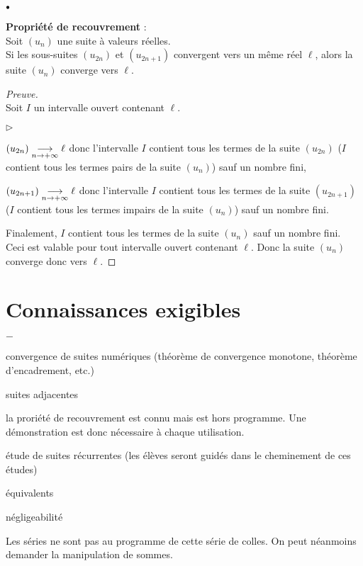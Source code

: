 \documentclass[11pt]{article}%
\begin{document}
\begin{noliste}{$\scriptstyle \bullet$}
   \item {\bf Propriété de recouvrement} :\\
   Soit $\left( u_n \right)$ une suite à valeurs réelles.\\ 
   Si les 
   sous-suites $\left(u_{2n} \right)$ et $\left( u_{2n+1} \right)$ 
   convergent vers un même réel $\ell$, alors la suite $\left( u_n 
   \right)$ converge vers $\ell$.
   \begin{proof}[Preuve]~\\
    Soit $I$ un intervalle ouvert contenant $\ell$.
    \begin{noliste}{$\triangleright$}
    \item $(u_{2n}) \underset{n\to +\infty}{\longrightarrow} \ell$ donc l'intervalle $I$ contient 
    tous les termes de la suite $(u_{2n})$ (\ie $I$ 
    contient tous les termes pairs de la suite $(u_{n})$) sauf un 
    nombre fini,
    \item $(u_{2n+1}) \underset{n\to +\infty}{\longrightarrow} \ell$ donc l'intervalle $I$ contient 
    tous les termes de la suite $(u_{2n+1})$ (\ie $I$ 
    contient tous les termes impairs de la suite $(u_{n})$) sauf un 
    nombre fini.
    \end{noliste}
    Finalement, $I$ contient tous les termes de la suite $\left( u_n 
    \right)$ sauf un nombre fini.\\
    Ceci est valable pour tout intervalle ouvert contenant $\ell$. 
    Donc la suite $\left( u_n \right)$ 
    converge donc vers $\ell$.
    \end{proof}
\end{noliste}


\section*{Connaissances exigibles}

\begin{noliste}{$-$}
\item convergence de suites numériques (théorème de convergence 
monotone, théorème d'encadrement, etc.)
\item suites adjacentes
\item la proriété de recouvrement est connu mais est hors programme. 
Une démonstration est donc nécessaire à chaque utilisation.
\item étude de suites récurrentes (les élèves seront guidés dans 
le cheminement de ces études)
\item équivalents
\item négligeabilité
\item Les séries ne sont pas au programme de cette série de colles. 
On peut néanmoins demander la manipulation de sommes.
\end{noliste}
\end{document}
